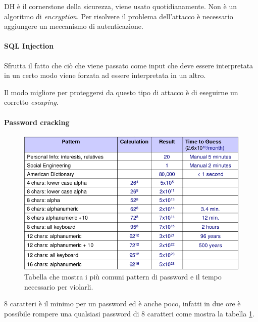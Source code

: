 DH è il cornerstone della sicurezza, viene usato quotidianamente. Non è un 
algoritmo di \textit{encryption}.
Per risolvere il problema dell'attacco è necessario aggiungere un meccanismo di 
autenticazione.

\paragraph{SQL Injection}

Sfrutta il fatto che ciò che viene passato come input che deve essere 
interpretata in un certo modo viene forzata ad essere interpretata in un altro.

Il modo migliore per proteggersi da questo tipo di attacco è di eseguirne un 
corretto \textit{escaping}.

\paragraph{Password cracking}

\begin{figure}[h!]
	\begin{center}
		\includegraphics[scale=0.65]{res/img/password_cracking_table.png}
	\end{center}
	\caption{Tabella che mostra i più comuni pattern di password e il tempo necessario per violarli.}
	\label{fig:password:cracking:table}
\end{figure}

8 caratteri è il minimo per un password ed è anche poco, infatti in due ore è possibile 
rompere una qualsiasi password di 8 caratteri come mostra la tabella \ref{fig:password:cracking:table}.

